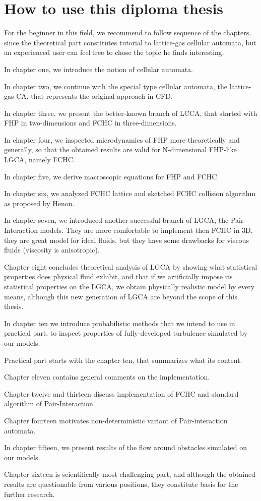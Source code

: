 \chapter*{How to use this diploma thesis}

For the beginner in this field, we recommend to follow sequence of the chapters, since the theoretical part constitutes tutorial to lattice-gas cellular automata, but an experienced user can feel free to chose the topic he finds interesting.

\bigskip

In chapter one, we introduce the notion of cellular automata.

In chapter two, we continue with the special type cellular automata, the lattice-gas CA, that represents the original approach in CFD.

In chapter three, we present the better-known branch of LCCA, that started with FHP in two-dimensions and FCHC in three-dimensions.

In chapter four, we inspected microdynamics of FHP more theoretically and generally, so that the obtained results are valid for N-dimensional FHP-like LGCA, namely FCHC.

In chapter five, we derive macroscopic equations for FHP and FCHC.

In chapter six, we analyzed FCHC lattice and sketched FCHC collision algorithm as proposed by Henon.

In chapter seven, we introduced another successful branch of LGCA, the Pair-Interaction models. They are more comfortable to implement then FCHC in 3D, they are great model for ideal fluids, but they have some drawbacks for viscous fluids (viscosity is anisotropic).

Chapter eight concludes theoretical analysis of LGCA by showing what statistical properties does physical fluid exhibit, and that if we artificially impose its statistical properties on the LGCA, we obtain physically realistic model by every means, although this new generation of LGCA are beyond the scope of this thesis.

In chapter ten we introduce probabilistic methods that we intend to use in practical part, to inspect properties of fully-developed turbulence simulated by our models.

\bigskip

Practical part starts with the chapter ten, that summarizes what its content.

Chapter eleven contains general comments on the implementation.

Chapter twelve and thirteen discuss implementation of FCHC and standard algorithm of Pair-Interaction

Chapter fourteen motivates non-deterministic variant of Pair-interaction automata.

In chapter fifteen, we present results of the flow around obstacles simulated on our models.

Chapter sixteen is scientifically most challenging part, and although the obtained results are questionable from various positions, they constitute basis for the further research.



